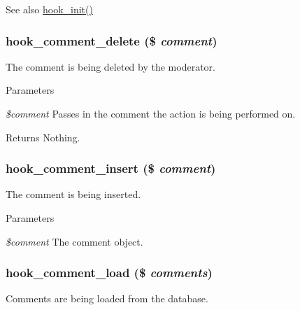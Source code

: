 \begin{DoxySeeAlso}{See also}
\hyperlink{group__hooks_ga74edef0c463436fdbb1f92ef367db051}{hook\_\-init()} 
\end{DoxySeeAlso}
\hypertarget{group__hooks_gab8d94c5665313a2d174628cc219f0395}{
\subsubsection[{hook\_\-comment\_\-delete}]{\setlength{\rightskip}{0pt plus 5cm}hook\_\-comment\_\-delete (\$ {\em comment})}}
\label{group__hooks_gab8d94c5665313a2d174628cc219f0395}
The comment is being deleted by the moderator.


\begin{DoxyParams}{Parameters}
\item[{\em \$comment}]Passes in the comment the action is being performed on. \end{DoxyParams}
\begin{DoxyReturn}{Returns}
Nothing. 
\end{DoxyReturn}
\hypertarget{group__hooks_ga3f972e92f09b1c9e8797fc9037e8c75d}{
\subsubsection[{hook\_\-comment\_\-insert}]{\setlength{\rightskip}{0pt plus 5cm}hook\_\-comment\_\-insert (\$ {\em comment})}}
\label{group__hooks_ga3f972e92f09b1c9e8797fc9037e8c75d}
The comment is being inserted.


\begin{DoxyParams}{Parameters}
\item[{\em \$comment}]The comment object. \end{DoxyParams}
\hypertarget{group__hooks_gafc29ce3a5bfc4778125ee3099850d96c}{
\subsubsection[{hook\_\-comment\_\-load}]{\setlength{\rightskip}{0pt plus 5cm}hook\_\-comment\_\-load (\$ {\em comments})}}
\label{group__hooks_gafc29ce3a5bfc4778125ee3099850d96c}
Comments are being loaded from the database.


